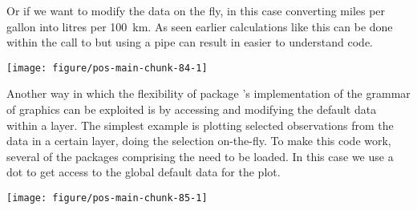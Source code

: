 \documentclass[krantz2]{krantz}\usepackage{knitr}%
\begin{document}
Or if we want to modify the data on the fly, in this case converting miles per gallon into litres per 100~km.  As seen earlier calculations like this can be done within the call to  but using a pipe can result in easier to understand code.

\begin{knitrout}\footnotesize
{}\color{fgcolor}

{\centering \texttt{[image: figure/pos-main-chunk-84-1]} 

}



\end{knitrout}

Another way in which the flexibility of package 's implementation of the grammar of graphics can be exploited is by accessing and modifying the default data within a layer. The simplest example is plotting selected observations from the data in a certain layer, doing the selection on-the-fly. To make this code work, several of the packages comprising the  need to be loaded. In this case we use a dot  to get access to the global default data for the plot.

\begin{knitrout}\footnotesize
{}\color{fgcolor}

{\centering \texttt{[image: figure/pos-main-chunk-85-1]} 

}



\end{knitrout}
\end{document}
